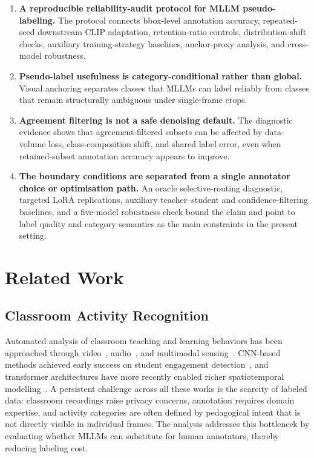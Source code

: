 \documentclass{ieeeaccess}
\begin{document}
\begin{enumerate}

  \item \textbf{A reproducible reliability-audit protocol for MLLM
  pseudo-labeling.}
  The protocol connects bbox-level annotation accuracy, repeated-seed
  downstream CLIP adaptation, retention-ratio controls,
  distribution-shift checks, auxiliary training-strategy baselines,
  anchor-proxy analysis, and cross-model robustness.

  \item \textbf{Pseudo-label usefulness is category-conditional rather
  than global.}
  Visual anchoring separates classes that MLLMs can label reliably
  from classes that remain structurally ambiguous under single-frame
  crops.

  \item \textbf{Agreement filtering is not a safe denoising default.}
  The diagnostic evidence shows that agreement-filtered subsets can be
  affected by data-volume loss, class-composition shift, and shared
  label error, even when retained-subset annotation accuracy appears to
  improve.

  \item \textbf{The boundary conditions are separated from a single
  annotator choice or optimisation path.}
  An oracle selective-routing diagnostic, targeted LoRA replications,
  auxiliary teacher--student and confidence-filtering baselines, and a
  five-model robustness check bound the claim and point to label quality
  and category semantics as the main constraints in the present setting.

\end{enumerate}


\section{Related Work}
\label{sec:related}

\subsection{Classroom Activity Recognition}

Automated analysis of classroom teaching and learning behaviors has
been approached through video~\cite{whitehill2014automated},
audio~\cite{donnelly2017automatic}, and multimodal
sensing~\cite{dillenbourg2011classroom}.
CNN-based methods achieved early success on student engagement
detection~\cite{zhang2020classroom_cnn}, and transformer architectures
have more recently enabled richer spatiotemporal
modelling~\cite{li2022classroom_transformer}.
A persistent challenge across all these works is the scarcity of
labeled data: classroom recordings raise privacy concerns, annotation
requires domain expertise, and activity categories are often defined
by pedagogical intent that is not directly visible in individual
frames.
The analysis addresses this bottleneck by evaluating whether
MLLMs can substitute for human annotators, thereby reducing labeling
cost.
\end{document}
